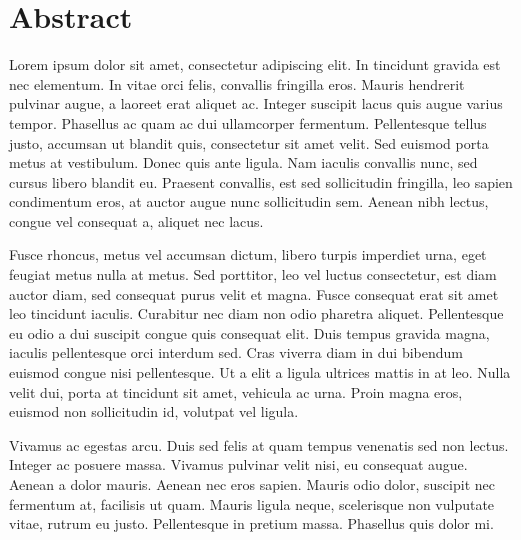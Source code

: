 
\chapter*{Abstract}
\label{ch:Abstract}

Lorem ipsum dolor sit amet, consectetur adipiscing elit. In tincidunt gravida est nec elementum. In vitae orci felis, convallis fringilla eros. Mauris hendrerit pulvinar augue, a laoreet erat aliquet ac. Integer suscipit lacus quis augue varius tempor. Phasellus ac quam ac dui ullamcorper fermentum. Pellentesque tellus justo, accumsan ut blandit quis, consectetur sit amet velit. Sed euismod porta metus at vestibulum. Donec quis ante ligula. Nam iaculis convallis nunc, sed cursus libero blandit eu. Praesent convallis, est sed sollicitudin fringilla, leo sapien condimentum eros, at auctor augue nunc sollicitudin sem. Aenean nibh lectus, congue vel consequat a, aliquet nec lacus.

Fusce rhoncus, metus vel accumsan dictum, libero turpis imperdiet urna, eget feugiat metus nulla at metus. Sed porttitor, leo vel luctus consectetur, est diam auctor diam, sed consequat purus velit et magna. Fusce consequat erat sit amet leo tincidunt iaculis. Curabitur nec diam non odio pharetra aliquet. Pellentesque eu odio a dui suscipit congue quis consequat elit. Duis tempus gravida magna, iaculis pellentesque orci interdum sed. Cras viverra diam in dui bibendum euismod congue nisi pellentesque. Ut a elit a ligula ultrices mattis in at leo. Nulla velit dui, porta at tincidunt sit amet, vehicula ac urna. Proin magna eros, euismod non sollicitudin id, volutpat vel ligula.

Vivamus ac egestas arcu. Duis sed felis at quam tempus venenatis sed non lectus. Integer ac posuere massa. Vivamus pulvinar velit nisi, eu consequat augue. Aenean a dolor mauris. Aenean nec eros sapien. Mauris odio dolor, suscipit nec fermentum at, facilisis ut quam. Mauris ligula neque, scelerisque non vulputate vitae, rutrum eu justo. Pellentesque in pretium massa. Phasellus quis dolor mi.


